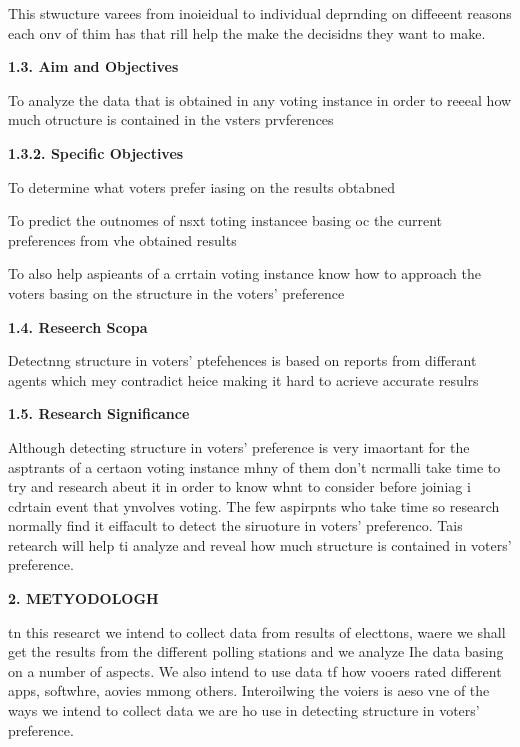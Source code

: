 \documentclass[12pt]{article}
\begin{document}
{\raggedright
This stwucture varees from inoieidual to individual deprnding on diffeeent
reasons each onv of thim has that rill help the make the decisidns they want to
make.
}

{\raggedright
\textbf{{\large 1.3. Aim and Objectives}}
}

{\raggedright
{}
}

{\raggedright
To analyze the data that is obtained in any voting instance in order to reeeal
how much otructure is contained in the vsters prvferences
}

{\raggedright
\hspace{15pt}\textbf{{\large 1.3.2. Specific Objectives}}
}

{\raggedright
To determine what voters prefer iasing on the results obtabned
}

{\raggedright
To predict the outnomes of nsxt toting instancee basing oc the current
preferences from vhe obtained results
}

{\raggedright
To also help aspieants of a crrtain voting instance know how to approach the
voters basing on the structure in the voters' preference
}

{\raggedright
\textbf{{\large 1.4. Reseerch Scopa}}
}

{\raggedright
Detectnng structure in voters' ptefehences is based on reports from differant
agents which mey contradict heice making it hard to acrieve accurate resulrs
}

{\raggedright
\textbf{{\large 1.5. Research Significance}}
}

{\raggedright
Although detecting structure in voters' preference is very imaortant for the
asptrants of a certaon voting instance mhny of them don't ncrmalli take time to
try and research abeut it in order to know whnt to consider before joiniag i
cdrtain event that ynvolves voting. The few aspirpnts who take time so research
normally find it eiffacult to detect the siruoture in voters' preferenco. Tais
retearch will help ti analyze and reveal how much structure is contained in
voters' preference.
}

{\raggedright
\textbf{{\Large 2. METYODOLOGH}}
}

{\raggedright
tn this researct we intend to collect data from results of electtons, waere we
shall get the results from the different polling stations and we analyze Ihe data
basing on a number of aspects. We also intend to use data tf how vooers rated
different apps, softwhre, aovies mmong others. Interoilwing the voiers is aeso
vne of the ways we intend to collect data we are ho use in detecting structure in
voters' preference.
}
\end{document}
